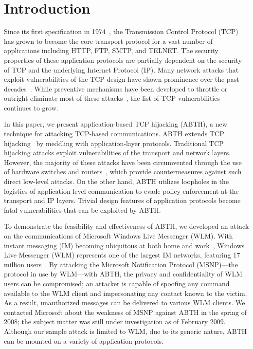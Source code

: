 \documentclass{sig-alternate}
\begin{document}

\section{Introduction}

Since its first specification in 1974~\cite{rfc:tcp}, the Transmission Control Protocol (TCP) has grown to become the core transport protocol for a vast number of applications including HTTP, FTP, SMTP, and TELNET.
The security properties of these application protocols are partially dependent on the security of TCP and the underlying Internet Protocol (IP).
Many network attacks that exploit vulnerabilities of the TCP design have shown prominence over the past decades~\cite{harris:tcpattacks}.
While preventive mechanisms have been developed to throttle or outright eliminate most of these attacks~\cite{dubrawsky:layer2}, the list of TCP vulnerabilities continues to grow.

In this paper, we present application-based TCP hijacking (ABTH), a new technique for attacking TCP-based communications.
ABTH extends TCP hijacking~\cite{stamp:infosec} by meddling with application-layer protocols.
Traditional TCP hijacking attacks exploit vulnerabilities of the transport and network layers.
However, the majority of these attacks have been circumvented through the use of hardware switches and routers~\cite{dubrawsky:layer2}, which provide countermeasures against such direct low-level attacks.
On the other hand, ABTH utilizes loopholes in the logistics of application-level communication to evade policy enforcement at the transport and IP layers.
Trivial design features of application protocols become fatal vulnerabilities that can be exploited by ABTH.

\begin{sloppypar}
To demonstrate the feasibility and effectiveness of ABTH, we developed an attack on the communications of Microsoft Windows Live Messenger (WLM).
With instant messaging (IM) becoming ubiquitous at both home and work~\cite{aol:survey}, Windows Live Messenger (WLM) represents one of the largest IM networks, featuring 17 million users~\cite{microsoft:advertising}.
By attacking the Microsoft Notification Protocol (MSNP)---the protocol in use by WLM---with ABTH, the privacy and confidentiality of WLM users can be compromised; an attacker is capable of spoofing any command available to the WLM client and impersonating any contact known to the victim.
As a result, unauthorized messages can be delivered to various WLM clients.
We contacted Microsoft about the weakness of MSNP against ABTH in the spring of 2008; the subject matter was still under investigation as of February 2009.
Although our sample attack is limited to WLM, due to its generic nature, ABTH can be mounted on a variety of application protocols.
\end{sloppypar}
\end{document}
